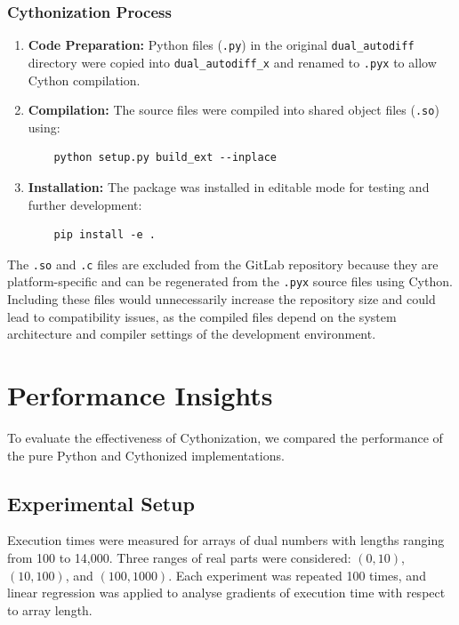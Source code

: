 \documentclass[a4paper,12pt]{article}
\begin{document}
\subsubsection{Cythonization Process}
\begin{enumerate}
    \item \textbf{Code Preparation:} 
    Python files (\texttt{.py}) in the original \texttt{dual\_autodiff} directory were copied into \texttt{dual\_autodiff\_x} and renamed to \texttt{.pyx} to allow Cython compilation.
    
    \item \textbf{Compilation:} 
    The source files were compiled into shared object files (\texttt{.so}) using:
    \begin{verbatim}
    python setup.py build_ext --inplace
    \end{verbatim}
    
    \item \textbf{Installation:} 
    The package was installed in editable mode for testing and further development:
    \begin{verbatim}
    pip install -e .
    \end{verbatim}
\end{enumerate}

The \texttt{.so} and \texttt{.c} files are excluded from the GitLab repository because they are platform-specific and can be regenerated from the \texttt{.pyx} source files using Cython. Including these files would unnecessarily increase the repository size and could lead to compatibility issues, as the compiled files depend on the system architecture and compiler settings of the development environment.

\section{Performance Insights}
To evaluate the effectiveness of Cythonization, we compared the performance of the pure Python and Cythonized implementations.

\subsection{Experimental Setup}
Execution times were measured for arrays of dual numbers with lengths ranging from 100 to 14,000. Three ranges of real parts were considered: \((0,10)\), \((10,100)\), and \((100,1000)\). Each experiment was repeated 100 times, and linear regression was applied to analyse gradients of execution time with respect to array length.
\end{document}
